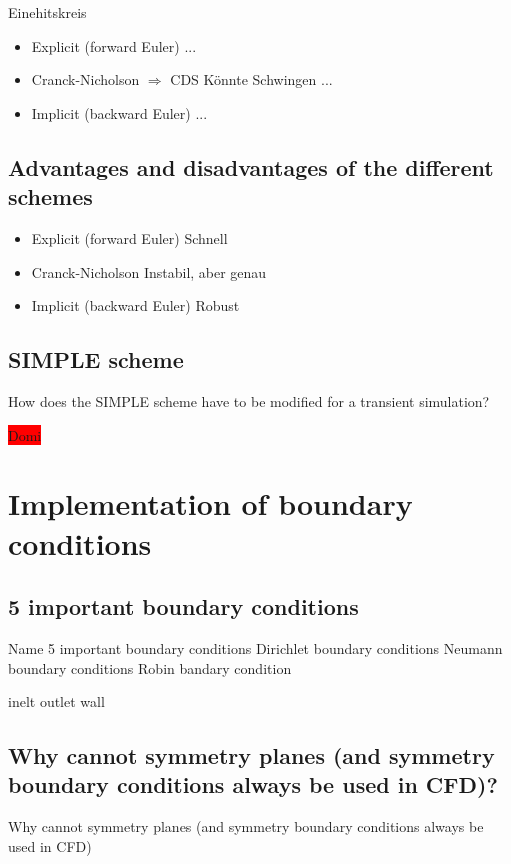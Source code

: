 \documentclass[a4paper]{scrartcl}
\begin{document}
Einehitskreis 
\begin{itemize}
\item Explicit (forward Euler)
...

\item Cranck-Nicholson $\Rightarrow$ CDS
Könnte Schwingen
...

\item Implicit (backward Euler)
...

\end{itemize}
\subsection{Advantages and disadvantages of the different schemes}
\begin{itemize}
\item Explicit (forward Euler)
Schnell

\item Cranck-Nicholson
Instabil, aber genau

\item Implicit (backward Euler)
Robust 
\end{itemize}
\subsection{SIMPLE scheme}
How does the SIMPLE scheme have to be modified for a transient
simulation?

\colorbox{red}{Domi}


\section{Implementation of boundary conditions}


\subsection{5 important boundary conditions}

 Name 5 important boundary
conditions Dirichlet boundary conditions
Neumann boundary conditions
Robin bandary  condition


inelt
outlet
wall



\subsection{Why cannot symmetry planes (and symmetry boundary conditions always
be used in CFD)?}
Why cannot symmetry planes (and symmetry boundary conditions always
be used in CFD)
\end{document}
